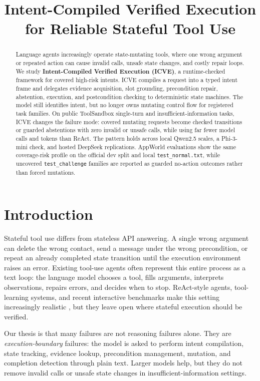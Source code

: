 \documentclass[11pt]{article}
\title{Intent-Compiled Verified Execution for Reliable Stateful Tool Use}
\author{}
\begin{document}
\maketitle

\begin{abstract}
Language agents increasingly operate state-mutating tools, where one wrong argument or
repeated action can cause invalid calls, unsafe state changes, and costly repair loops.
We study \textbf{Intent-Compiled Verified Execution (ICVE)}, a runtime-checked framework
for covered high-risk intents. ICVE compiles a request into a typed intent frame and
delegates evidence acquisition, slot grounding, precondition repair, abstention,
execution, and postcondition checking to deterministic state machines. The model still
identifies intent, but no longer owns mutating control flow for registered task families.
On public ToolSandbox single-turn and insufficient-information tasks, ICVE changes the
failure mode: covered mutating requests become checked transitions or guarded abstentions
with zero invalid or unsafe calls, while using far fewer model calls and tokens than
ReAct. The pattern holds across local Qwen2.5 scales, a Phi-3-mini check, and hosted
DeepSeek replications. AppWorld evaluations show the same coverage-risk profile on the
official dev split and local \texttt{test\_normal.txt}, while uncovered
\texttt{test\_challenge} families are reported as guarded no-action outcomes rather than
forced mutations.
\end{abstract}

\section{Introduction}

Stateful tool use differs from stateless API answering. A single wrong argument can delete
the wrong contact, send a message under the wrong precondition, or repeat an already
completed state transition until the execution environment raises an error. Existing
tool-use agents often represent this entire process as a text loop: the language model
chooses a tool, fills arguments, interprets observations, repairs errors, and decides when
to stop. ReAct-style agents, tool-learning systems, and recent interactive benchmarks
make this setting increasingly realistic \citep{yao2022react,schick2023toolformer,
lu2024toolsandbox,appworld2024,wang2025dialogtool}, but they leave open where stateful
execution should be verified.

Our thesis is that many failures are not reasoning failures alone. They are
\emph{execution-boundary} failures: the model is asked to perform intent compilation,
state tracking, evidence lookup, precondition management, mutation, and completion
detection through plain text. Larger models help, but they do not remove invalid calls or
unsafe state changes in insufficient-information settings.
\end{document}
